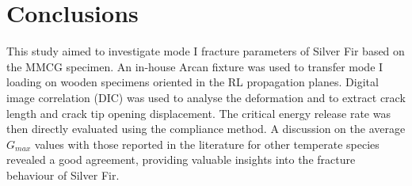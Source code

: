 \documentclass[3p,times,procedia]{elsarticle}
\begin{document}


\section{Conclusions}\label{S:con}

This study aimed to investigate mode I fracture parameters of Silver Fir based on the MMCG specimen. An in-house Arcan fixture was used to transfer mode I loading on wooden specimens oriented in the RL propagation planes. Digital image correlation (DIC) was used to analyse the deformation and to extract crack length and crack tip opening displacement. The critical energy release rate was then directly evaluated using the compliance method. A discussion on the average $G_{max}$ values with those reported in the literature for other temperate species revealed a good agreement, providing valuable insights into the fracture behaviour of Silver Fir.

\end{document}
